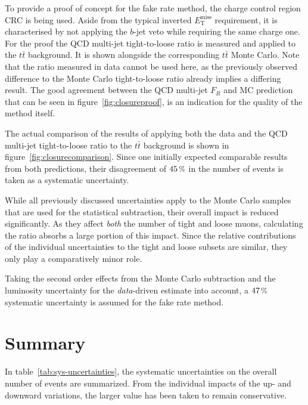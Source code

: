 To provide a proof of concept for the fake rate method, the charge control region CRC is being used. Aside from the typical inverted $E_{\text{T}}^{\text{miss}}$ requirement, it is characterised by not applying the $b$-jet veto while requiring the same charge one. For the proof the QCD multi-jet tight-to-loose ratio is measured and applied to the $t\bar{t}$ background. It is shown alongside the corresponding $t\bar{t}$ Monte Carlo. Note that the ratio measured in data cannot be used here, as the previously observed difference to the Monte Carlo tight-to-loose ratio already implies a differing result. The good agreement between the QCD multi-jet $F_R$ and MC prediction that can be seen in figure~\ref{fig:closureproof}, is an indication for the quality of the method itself.

The actual comparison of the results of applying both the data and the QCD multi-jet tight-to-loose ratio to the $t\bar{t}$ background is shown in figure~\ref{fig:closurecomparison}. Since one initially expected comparable results from both predictions, their disagreement of $45\,\pct$ in the number of events is taken as a systematic uncertainty.

While all previously discussed uncertainties apply to the Monte Carlo samples that are used for the statistical subtraction, their overall impact is reduced significantly. As they affect \textit{both} the number of tight and loose muons, calculating the ratio absorbs a large portion of this impact. Since the relative contributions of the individual uncertainties to the tight and loose subsets are similar, they only play a comparatively minor role.

Taking the second order effects from the Monte Carlo subtraction and the luminosity uncertainty for the \textit{data}-driven estimate into account, a $47\,\pct$ systematic uncertainty is assumed for the fake rate method.


\section{Summary}
\label{sec:summary}

In table~\ref{tab:sys-uncertainties}, the systematic uncertainties on the overall number of events are summarized. From the individual impacts of the up- and downward variations, the larger value has been taken to remain conservative.

